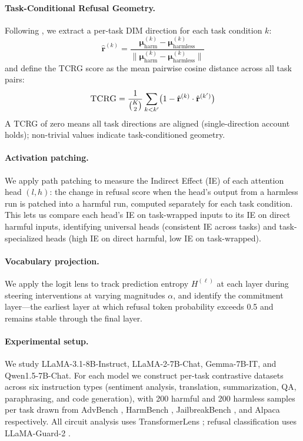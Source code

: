 \documentclass[11pt]{article}
\newcommand{\tcrg}{\textsc{TCRG}}
\begin{document}
\paragraph{Task-Conditional Refusal Geometry.}
Following \citet{arditi2024refusal}, we extract a per-task DIM direction for each task condition $k$:
\begin{equation}
  \hat{\mathbf{r}}^{(k)} = \frac{\boldsymbol{\mu}^{(k)}_\text{harm} - \boldsymbol{\mu}^{(k)}_\text{harmless}}{\|\boldsymbol{\mu}^{(k)}_\text{harm} - \boldsymbol{\mu}^{(k)}_\text{harmless}\|}
\end{equation}
and define the \tcrg{} score as the mean pairwise cosine distance across all task pairs:
\begin{equation}
  \tcrg = \frac{1}{\binom{K}{2}} \sum_{k < k'} \bigl(1 - \hat{\mathbf{r}}^{(k)} \cdot \hat{\mathbf{r}}^{(k')}\bigr)
\end{equation}
A \tcrg{} of zero means all task directions are aligned (single-direction account holds); non-trivial values indicate task-conditioned geometry.

\paragraph{Activation patching.}
We apply path patching \citep{goldowsky2023localizing,meng2022locating} to measure the Indirect Effect (IE) of each attention head $(l, h)$: the change in refusal score when the head's output from a harmless run is patched into a harmful run, computed separately for each task condition. This lets us compare each head's IE on task-wrapped inputs to its IE on direct harmful inputs, identifying universal heads (consistent IE across tasks) and task-specialized heads (high IE on direct harmful, low IE on task-wrapped).

\paragraph{Vocabulary projection.}
We apply the logit lens \citep{nostalgebraist2020logit} to track prediction entropy $H^{(\ell)}$ at each layer during steering interventions at varying magnitudes $\alpha$, and identify the commitment layer---the earliest layer at which refusal token probability exceeds 0.5 and remains stable through the final layer.

\paragraph{Experimental setup.}
We study LLaMA-3.1-8B-Instruct, LLaMA-2-7B-Chat, Gemma-7B-IT, and Qwen1.5-7B-Chat. For each model we construct per-task contrastive datasets across six instruction types (sentiment analysis, translation, summarization, QA, paraphrasing, and code generation), with 200 harmful and 200 harmless samples per task drawn from AdvBench \citep{zou2023advbench}, HarmBench \citep{mazeika2024harmbench}, JailbreakBench \citep{chao2024jailbreakbench}, and Alpaca \citep{taori2023alpaca} respectively. All circuit analysis uses TransformerLens \citep{nanda2022transformerlens}; refusal classification uses LLaMA-Guard-2 \citep{metallamaguard2024}.
\end{document}
